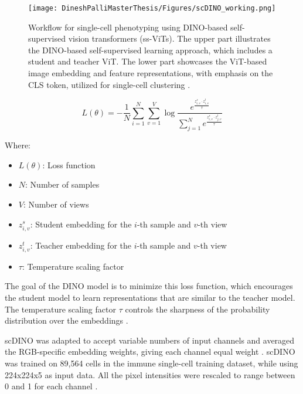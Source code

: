 \documentclass[12pt,a4paper]{article}
\begin{document}
\begin{figure}
  \centering
  \texttt{[image: DineshPalliMasterThesis/Figures/scDINO\_working.png]}
  \caption{Workflow for single-cell phenotyping using DINO-based self-supervised vision transformers (ss-ViTs). The upper part illustrates the DINO-based self-supervised learning approach, which includes a student and teacher ViT. The lower part showcases the ViT-based image embedding and feature representations, with emphasis on the CLS token, utilized for single-cell clustering \cite{Pfaendler2023.01.16.524226}.}
  \label{scdinoworking}
\end{figure}

$$
L(\theta) = -\frac{1}{N} \sum_{i=1}^{N} \sum_{v=1}^{V} \log \frac{e^{\frac{z_{i,v}^s \cdot z_{i,v}^t}{\tau}}}{\sum_{j=1}^{N} e^{\frac{z_{i,v}^s \cdot z_{j,v}^t}{\tau}}}
$$

Where:
\begin{itemize}
\item $L(\theta)$: Loss function
\item $N$: Number of samples
\item $V$: Number of views
\item $z_{i,v}^s$: Student embedding for the $i$-th sample and $v$-th view
\item $z_{i,v}^t$: Teacher embedding for the $i$-th sample and $v$-th view
\item $\tau$: Temperature scaling factor
\end{itemize}

The goal of the DINO model is to minimize this loss function, which encourages the student model to learn representations that are similar to the teacher model. The temperature scaling factor $\tau$ controls the sharpness of the probability distribution over the embeddings \cite{Pfaendler2023.01.16.524226}.

scDINO was adapted to accept variable numbers of input channels and averaged the RGB-specific embedding weights, giving each channel equal weight \cite{Pfaendler2023.01.16.524226}. scDINO was trained on 89,564 cells in the immune single-cell training dataset, while using 224x224x5 as input data. All the pixel intensities were rescaled to range between 0 and 1 for each channel \cite{Pfaendler2023.01.16.524226}.
\end{document}

